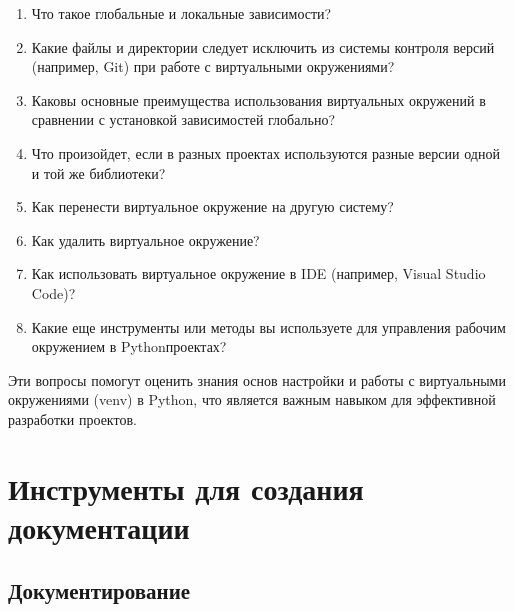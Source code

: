 \documentclass[letterpaper,10pt,russian]{sphinxmanual}
\begin{document}
\begin{enumerate}
\item {} 
\sphinxAtStartPar
Что такое глобальные и локальные зависимости?

\item {} 
\sphinxAtStartPar
Какие файлы и директории следует исключить из системы контроля версий (например, Git) при работе с виртуальными окружениями?

\item {} 
\sphinxAtStartPar
Каковы основные преимущества использования виртуальных окружений в сравнении с установкой зависимостей глобально?

\item {} 
\sphinxAtStartPar
Что произойдет, если в разных проектах используются разные версии одной и той же библиотеки?

\item {} 
\sphinxAtStartPar
Как перенести виртуальное окружение на другую систему?

\item {} 
\sphinxAtStartPar
Как удалить виртуальное окружение?

\item {} 
\sphinxAtStartPar
Как использовать виртуальное окружение в IDE (например, Visual Studio Code)?

\item {} 
\sphinxAtStartPar
Какие еще инструменты или методы вы используете для управления рабочим окружением в Python\sphinxhyphen{}проектах?

\end{enumerate}

\sphinxAtStartPar
Эти вопросы помогут оценить знания основ настройки и работы с виртуальными окружениями (venv) в Python, что является важным навыком для эффективной разработки проектов.


\chapter{Инструменты для создания документации}
\label{\detokenize{index:id12}}
\sphinxstepscope


\section{Документирование}
\label{\detokenize{educational_materials/docs/content:id1}}\label{\detokenize{educational_materials/docs/content::doc}}
\end{document}
